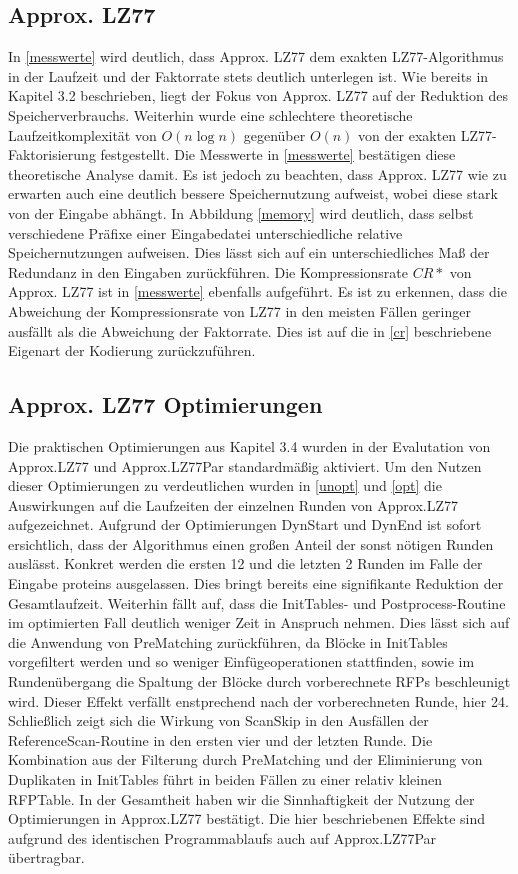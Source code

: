 \subsection{Approx. LZ77}
In \ref{messwerte} wird deutlich, dass Approx. LZ77 dem exakten LZ77-Algorithmus in der Laufzeit und der Faktorrate stets deutlich unterlegen ist. Wie bereits in Kapitel
3.2 beschrieben, liegt der Fokus von Approx. LZ77 auf der Reduktion des Speicherverbrauchs. Weiterhin wurde eine schlechtere theoretische Laufzeitkomplexität von
$O(n\log n)$ gegenüber $O(n)$ von der exakten LZ77-Faktorisierung festgestellt. Die Messwerte in \ref{messwerte} bestätigen diese theoretische Analyse damit. Es ist 
jedoch zu beachten, dass Approx. LZ77 wie zu erwarten auch eine deutlich bessere Speichernutzung aufweist, wobei diese stark von der Eingabe abhängt. In Abbildung 
\ref{memory} wird deutlich, dass selbst verschiedene Präfixe einer Eingabedatei unterschiedliche relative Speichernutzungen aufweisen. Dies lässt sich auf ein 
unterschiedliches Maß der Redundanz in den Eingaben zurückführen. Die Kompressionsrate $CR*$ von Approx. LZ77 ist in \ref{messwerte} ebenfalls aufgeführt. Es ist 
zu erkennen, dass die Abweichung der Kompressionsrate von LZ77 in den meisten Fällen geringer ausfällt als die Abweichung der Faktorrate. Dies ist auf die in 
\ref{cr} beschriebene Eigenart der Kodierung zurückzuführen.

\subsection{Approx. LZ77 Optimierungen}
Die praktischen Optimierungen aus Kapitel 3.4 wurden in der Evalutation von Approx.LZ77 und Approx.LZ77Par standardmäßig aktiviert. Um den Nutzen dieser Optimierungen
zu verdeutlichen wurden in \ref{unopt} und \ref{opt} die Auswirkungen auf die Laufzeiten der einzelnen Runden von Approx.LZ77 aufgezeichnet. Aufgrund der 
Optimierungen DynStart und DynEnd ist sofort ersichtlich, dass der Algorithmus einen großen Anteil der sonst nötigen Runden auslässt. Konkret werden die ersten 12 und
die letzten 2 Runden im Falle der Eingabe proteins ausgelassen. Dies bringt bereits eine signifikante Reduktion der Gesamtlaufzeit. Weiterhin fällt auf, dass die 
InitTables- und Postprocess-Routine im optimierten Fall deutlich weniger Zeit in Anspruch nehmen. Dies lässt sich auf die Anwendung von PreMatching zurückführen,
da Blöcke in InitTables vorgefiltert werden und so weniger Einfügeoperationen stattfinden, sowie im Rundenübergang die Spaltung der Blöcke durch vorberechnete RFPs
beschleunigt wird. Dieser Effekt verfällt enstprechend nach der vorberechneten Runde, hier 24. Schließlich zeigt sich die Wirkung von ScanSkip in den Ausfällen
der ReferenceScan-Routine in den ersten vier und der letzten Runde. Die Kombination aus der Filterung durch PreMatching und der Eliminierung von Duplikaten in 
InitTables führt in beiden Fällen zu einer relativ kleinen RFPTable. In der Gesamtheit haben wir die Sinnhaftigkeit der Nutzung der Optimierungen in Approx.LZ77 
bestätigt. Die hier beschriebenen Effekte sind aufgrund des identischen Programmablaufs auch auf Approx.LZ77Par übertragbar.

